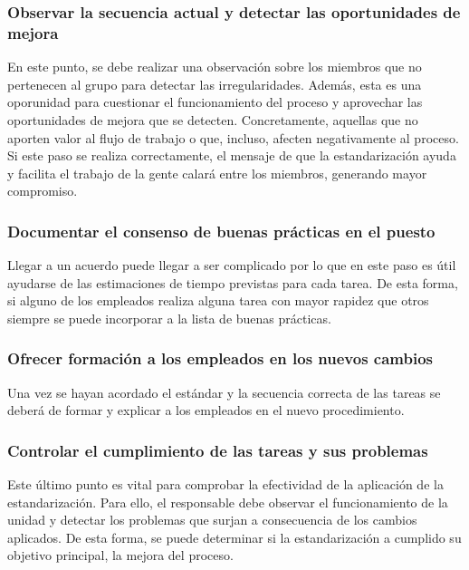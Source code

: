 \subsubsection{Observar la secuencia actual y detectar las oportunidades de mejora}

En este punto, se debe realizar una observación sobre los miembros que no pertenecen al grupo para detectar las irregularidades.
Además, esta es una oporunidad para cuestionar el funcionamiento del proceso y aprovechar las oportunidades de mejora que se detecten.
Concretamente, aquellas que no aporten valor al flujo de trabajo o que, incluso, afecten negativamente al proceso.
Si este paso se realiza correctamente, el mensaje de que la estandarización ayuda y facilita el trabajo de la gente calará entre los miembros, generando mayor compromiso.

\subsubsection{Documentar el consenso de buenas prácticas en el puesto}

Llegar a un acuerdo puede llegar a ser complicado por lo que en este paso es útil ayudarse de las estimaciones de tiempo previstas para cada tarea.
De esta forma, si alguno de los empleados realiza alguna tarea con mayor rapidez que otros siempre se puede incorporar a la lista de buenas prácticas.

\subsubsection{Ofrecer formación a los empleados en los nuevos cambios}

Una vez se hayan acordado el estándar y la secuencia correcta de las tareas se deberá de formar y explicar a los empleados en el nuevo procedimiento.

\subsubsection{Controlar el cumplimiento de las tareas y sus problemas}

Este último punto es vital para comprobar la efectividad de la aplicación de la estandarización. Para ello, el responsable debe observar el funcionamiento de la unidad y detectar los problemas que surjan a consecuencia de los cambios aplicados. De esta forma, se puede determinar si la estandarización a cumplido su objetivo principal, la mejora del proceso.

